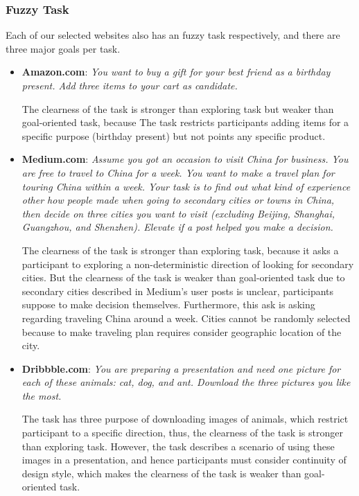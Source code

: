 \subsubsection{Fuzzy Task}

Each of our selected websites also has an fuzzy task respectively, and there are three major goals per task.

\begin{itemize}
    \item \textbf{Amazon.com}: \emph{You want to buy a gift for your best friend as a birthday present.
        Add three items to your cart as candidate.}

        The clearness of the task is stronger than exploring task but weaker than goal-oriented task, because
        The task restricts participants adding items for a specific purpose (birthday present) but not points
        any specific product.

    \item \textbf{Medium.com}: \emph{Assume you got an occasion to visit China for business. 
        You are free to travel to China for a week. 
        You want to make a travel plan for touring China within a week. Your task is to find out what kind 
        of experience other how people made when going to secondary cities or towns in China, then decide 
        on three cities you want to visit (excluding  Beijing, Shanghai, Guangzhou, and Shenzhen). 
        Elevate if a post helped you make a decision.}

        The clearness of the task is stronger than exploring task, because it asks a participant 
        to exploring a non-deterministic direction of looking for secondary cities.
        But the clearness of the task is weaker than goal-oriented task due to secondary cities described
        in Medium's user posts is unclear, participants suppose to make decision themselves.
        Furthermore, this ask is asking regarding traveling China around a week. Cities cannot be randomly
        selected because to make traveling plan requires consider geographic location of the city.

    \item \textbf{Dribbble.com}: \emph{You are preparing a presentation and need one picture for each of these animals: 
    cat, dog, and ant. Download the three pictures you like the most.}

        The task has three purpose of downloading images of animals, which restrict participant to a specific direction,
        thus, the clearness of the task is stronger than exploring task. However, the task describes a scenario of using
        these images in a presentation, and hence participants must consider continuity of design style, which makes
        the clearness of the task is weaker than goal-oriented task. 
\end{itemize}

\cleardoublepage